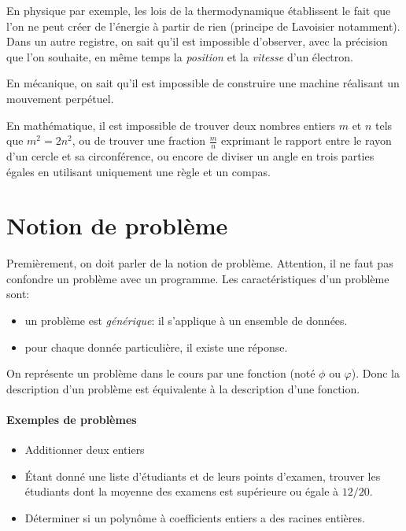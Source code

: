 En physique par exemple, les lois de la thermodynamique établissent le fait que l'on ne peut créer de l'énergie à partir de rien (principe de Lavoisier notamment). Dans un autre registre, on sait qu'il est impossible d'observer, avec la précision que l'on souhaite, en même temps la \textit{position} et la \textit{vitesse} d'un électron.

En mécanique, on sait qu'il est impossible de construire une machine réalisant un mouvement perpétuel.

En mathématique, il est impossible de trouver deux nombres entiers $m$ et $n$ tels que $m^2 = 2n^2$, ou de trouver une fraction $\frac{m}{n}$ exprimant le rapport entre le rayon d'un cercle et sa circonférence, ou encore de diviser un angle en trois parties égales en utilisant uniquement une règle et un compas.

\section{Notion de problème}
\label{sec:notion_de_probleme}

Premièrement, on doit parler de la notion de problème.
Attention, il ne faut pas confondre un problème avec un programme.
Les caractéristiques d'un problème sont:

\begin{itemize}
	\item un problème est \emph{générique}: il s'applique à un ensemble de données.
	\item pour chaque donnée particulière, il existe une réponse.
\end{itemize}

On représente un problème dans le cours par une fonction (noté $\phi$ ou $\varphi$).
Donc la description d'un problème est équivalente à la description d'une fonction.

\paragraph{Exemples de problèmes}
\begin{itemize}
	\item Additionner deux entiers
	\item Étant donné une liste d'étudiants et de leurs points d'examen, trouver les étudiants dont la moyenne des examens est supérieure ou égale à $12/20$.
	\item Déterminer si un polynôme à coefficients entiers a des racines entières.
\end{itemize}

